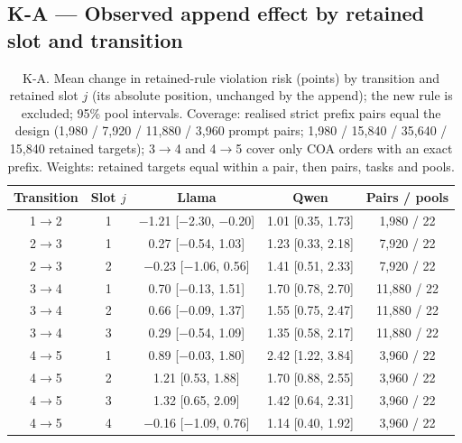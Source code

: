 \documentclass{article}
\begin{document}
\subsection*{K-A --- Observed append effect by retained slot and transition}
\begin{table}[h]
\centering\scriptsize
\caption{K-A. Mean change in retained-rule violation risk (points) by transition and retained slot $j$ (its absolute position, unchanged by the append); the new rule is excluded; 95\% pool intervals. Coverage: realised strict prefix pairs equal the design (1,980 / 7,920 / 11,880 / 3,960 prompt pairs; 1,980 / 15,840 / 35,640 / 15,840 retained targets); 3$\to$4 and 4$\to$5 cover only COA orders with an exact prefix. Weights: retained targets equal within a pair, then pairs, tasks and pools.}
\label{tab:KA}
\begin{tabular}{ccccc}
\toprule
Transition & Slot $j$ & Llama & Qwen & Pairs / pools \\
\midrule
1$\to$2 & 1 & $-$1.21 [$-$2.30, $-$0.20] & 1.01 [0.35, 1.73] & 1,980 / 22 \\
2$\to$3 & 1 & 0.27 [$-$0.54, 1.03] & 1.23 [0.33, 2.18] & 7,920 / 22 \\
2$\to$3 & 2 & $-$0.23 [$-$1.06, 0.56] & 1.41 [0.51, 2.33] & 7,920 / 22 \\
3$\to$4 & 1 & 0.70 [$-$0.13, 1.51] & 1.70 [0.78, 2.70] & 11,880 / 22 \\
3$\to$4 & 2 & 0.66 [$-$0.09, 1.37] & 1.55 [0.75, 2.47] & 11,880 / 22 \\
3$\to$4 & 3 & 0.29 [$-$0.54, 1.09] & 1.35 [0.58, 2.17] & 11,880 / 22 \\
4$\to$5 & 1 & 0.89 [$-$0.03, 1.80] & 2.42 [1.22, 3.84] & 3,960 / 22 \\
4$\to$5 & 2 & 1.21 [0.53, 1.88] & 1.70 [0.88, 2.55] & 3,960 / 22 \\
4$\to$5 & 3 & 1.32 [0.65, 2.09] & 1.42 [0.64, 2.31] & 3,960 / 22 \\
4$\to$5 & 4 & $-$0.16 [$-$1.09, 0.76] & 1.14 [0.40, 1.92] & 3,960 / 22 \\
\bottomrule
\end{tabular}
\end{table}
\end{document}
